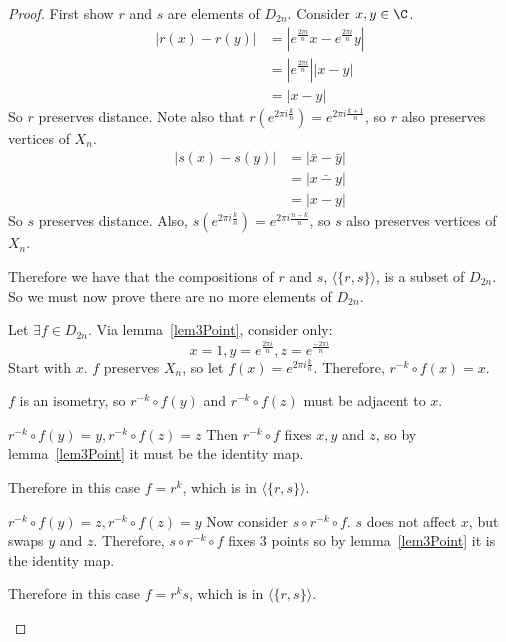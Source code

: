 \documentclass[../Main.tex]{subfiles}
\begin{document}
\begin{proof}
    First show $r$ and $s$ are elements of $D_{2n}$. Consider $x, y \in \C$.
    \begin{align*}
        |r(x) - r(y)| &= |e^\frac{2\pi i}{n} x - e^\frac{2\pi i}{n} y| \\
        &= |e^\frac{2\pi i}{n}| |x - y| \\
        &= |x - y|
    \end{align*}
    So $r$ preserves distance. Note also that $r(e^{2\pi i \frac{k}{n}}) = e^{2\pi i \frac{k+1}{n}}$, so $r$ also preserves vertices of $X_n$.
    \begin{align*}
        |s(x) - s(y)| &= |\bar{x} - \bar{y}| \\
        &= |\bar{x - y}| \\
        &= |x - y|
    \end{align*}
    So $s$ preserves distance. Also, $s(e^{2\pi i \frac{k}{n}}) = e^{2 \pi i \frac{n-k}{n}}$, so $s$ also preserves vertices of $X_n$.\par
    Therefore we have that the compositions of $r$ and $s$, $\langle \{r, s\} \rangle$, is a subset of $D_{2n}$. So we must now prove there are no more elements of $D_{2n}$.\par
    Let $\exists f \in D_{2n}$. Via lemma~\ref{lem3Point}, consider only:
    \begin{equation*}
        x = 1, y = e^\frac{2 \pi i}{n}, z = e^\frac{-2 \pi i}{n}
    \end{equation*}
    Start with $x$. $f$ preserves $X_n$, so let $f(x) = e^{2\pi i \frac{k}{n}}$. Therefore, $r^{-k} \circ f(x) = x$.\par
    $f$ is an isometry, so $r^{-k} \circ f(y)$ and $r^{-k} \circ f(z)$ must be adjacent to $x$.
    \begin{case}{$r^{-k} \circ f(y) = y, r^{-k} \circ f(z) = z$}
        Then $r^{-k} \circ f$ fixes $x, y$ and $z$, so by lemma~\ref{lem3Point} it must be the identity map.\par
        Therefore in this case $f = r^k$, which is in $\langle \{r, s\} \rangle$.
    \end{case}
    \begin{case}{$r^{-k} \circ f(y) = z, r^{-k} \circ f(z) = y$}
        Now consider $s \circ r^{-k} \circ f$. $s$ does not affect $x$, but swaps $y$ and $z$. Therefore, $s \circ r^{-k} \circ f$ fixes 3 points so by lemma~\ref{lem3Point} it is the identity map.\par
        Therefore in this case $f = r^k s$, which is in $\langle \{r, s\} \rangle$.

\end{case}
\end{proof}
\end{document}
